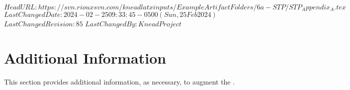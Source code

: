 \svnidlong
{$HeadURL: https://svn.riouxsvn.com/kneadlatxinputs/ExampleArtifactFolders/6a-STP/STP_Appendix_A.tex $}
{$LastChangedDate: 2024-02-25 09:33:45 -0500 (Sun, 25 Feb 2024) $}
{$LastChangedRevision: 85 $}
{$LastChangedBy: KneadProject $}

\chapter{Additional Information}
\label{sec:AdditionalInformation}

This section provides additional information, as necessary, to augment the \STP.